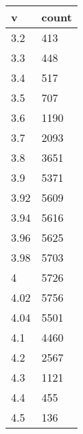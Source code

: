 \begin{table}[H]
    \centering
    \begin{tabular}{|l|l|}
    \hline
        v & count \\ \hline
        3.2 & 413 \\ \hline
        3.3 & 448 \\ \hline
        3.4 & 517 \\ \hline
        3.5 & 707 \\ \hline
        3.6 & 1190 \\ \hline
        3.7 & 2093 \\ \hline
        3.8 & 3651 \\ \hline
        3.9 & 5371 \\ \hline
        3.92 & 5609 \\ \hline
        3.94 & 5616 \\ \hline
        3.96 & 5625 \\ \hline
        3.98 & 5703 \\ \hline
        4 & 5726 \\ \hline
        4.02 & 5756 \\ \hline
        4.04 & 5501 \\ \hline
        4.1 & 4460 \\ \hline
        4.2 & 2567 \\ \hline
        4.3 & 1121 \\ \hline
        4.4 & 455 \\ \hline
        4.5 & 136 \\ \hline
    \end{tabular}
\end{table}